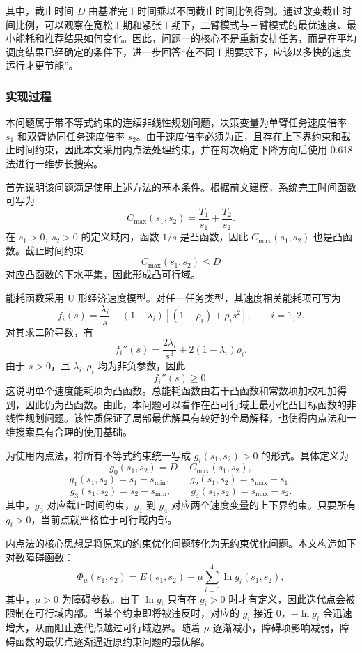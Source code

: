 其中，截止时间 $D$ 由基准完工时间乘以不同截止时间比例得到。通过改变截止时间比例，可以观察在宽松工期和紧张工期下，二臂模式与三臂模式的最优速度、最小能耗和推荐结果如何变化。因此，问题一的核心不是重新安排任务，而是在平均调度结果已经确定的条件下，进一步回答“在不同工期要求下，应该以多快的速度运行才更节能”。



\subsubsection{实现过程}

本问题属于带不等式约束的连续非线性规划问题，决策变量为单臂任务速度倍率 $s_1$ 和双臂协同任务速度倍率 $s_2$。由于速度倍率必须为正，且存在上下界约束和截止时间约束，因此本文采用内点法处理约束，并在每次确定下降方向后使用 0.618 法进行一维步长搜索。

首先说明该问题满足使用上述方法的基本条件。根据前文建模，系统完工时间函数可写为
\[
	C_{\max}(s_1,s_2)
	=
	\frac{T_1}{s_1}
	+
	\frac{T_2}{s_2}.
\]
在 $s_1>0,\ s_2>0$ 的定义域内，函数 $1/s$ 是凸函数，因此 $C_{\max}(s_1,s_2)$ 也是凸函数。截止时间约束
\[
	C_{\max}(s_1,s_2)\leq D
\]
对应凸函数的下水平集，因此形成凸可行域。

能耗函数采用 U 形经济速度模型。对任一任务类型，其速度相关能耗项可写为
\[
	f_i(s)
	=
	\frac{\lambda_i}{s}
	+
	(1-\lambda_i)\left[(1-\rho_i)+\rho_i s^2\right],
	\qquad i=1,2.
\]
对其求二阶导数，有
\[
	f_i''(s)
	=
	\frac{2\lambda_i}{s^3}
	+
	2(1-\lambda_i)\rho_i .
\]
由于 $s>0$，且 $\lambda_i,\rho_i$ 均为非负参数，因此
\[
	f_i''(s)\geq 0.
\]
这说明单个速度能耗项为凸函数。总能耗函数由若干凸函数和常数项加权相加得到，因此仍为凸函数。由此，本问题可以看作在凸可行域上最小化凸目标函数的非线性规划问题。该性质保证了局部最优解具有较好的全局解释，也使得内点法和一维搜索具有合理的使用基础。

为使用内点法，将所有不等式约束统一写成 $g_i(s_1,s_2)>0$ 的形式。具体定义为
\[
	g_0(s_1,s_2)
	=
	D-C_{\max}(s_1,s_2),
\]
\[
	g_1(s_1,s_2)=s_1-s_{\min},
	\qquad
	g_2(s_1,s_2)=s_{\max}-s_1,
\]
\[
	g_3(s_1,s_2)=s_2-s_{\min},
	\qquad
	g_4(s_1,s_2)=s_{\max}-s_2.
\]
其中，$g_0$ 对应截止时间约束，$g_1$ 到 $g_4$ 对应两个速度变量的上下界约束。只要所有 $g_i>0$，当前点就严格位于可行域内部。

内点法的核心思想是将原来的约束优化问题转化为无约束优化问题。本文构造如下对数障碍函数：
\[
	\Phi_{\mu}(s_1,s_2)
	=
	E(s_1,s_2)
	-
	\mu
	\sum_{i=0}^{4}
	\ln g_i(s_1,s_2),
\]
其中，$\mu>0$ 为障碍参数。由于 $\ln g_i$ 只有在 $g_i>0$ 时才有定义，因此迭代点会被限制在可行域内部。当某个约束即将被违反时，对应的 $g_i$ 接近 0，$-\ln g_i$ 会迅速增大，从而阻止迭代点越过可行域边界。随着 $\mu$ 逐渐减小，障碍项影响减弱，障碍函数的最优点逐渐逼近原约束问题的最优解。

